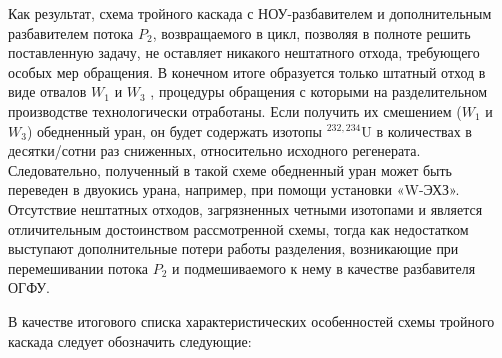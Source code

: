 Как результат, схема тройного каскада с НОУ-разбавителем и дополнительным разбавителем потока $P_2$, возвращаемого в цикл, позволяя в полноте решить поставленную задачу, не оставляет никакого нештатного отхода, требующего особых мер обращения. В конечном итоге образуется только штатный отход в виде отвалов $W_1$ и $W_3$ , процедуры обращения с которыми на разделительном производстве технологически отработаны. Если получить их смешением ($W_1$ и $W_3$) обедненный уран, он будет содержать изотопы $^{232,234}$U в количествах в десятки/сотни раз сниженных, относительно исходного регенерата. Следовательно, полученный в такой схеме обедненный уран может быть переведен в двуокись урана, например, при помощи установки «W-ЭХЗ». Отсутствие нештатных отходов, загрязненных четными изотопами и является отличительным достоинством рассмотренной схемы, тогда как недостатком выступают дополнительные потери работы разделения, возникающие при перемешивании потока $P_2$ и подмешиваемого к нему в качестве разбавителя ОГФУ.


В качестве итогового списка характеристических особенностей схемы тройного каскада следует обозначить следующие:

